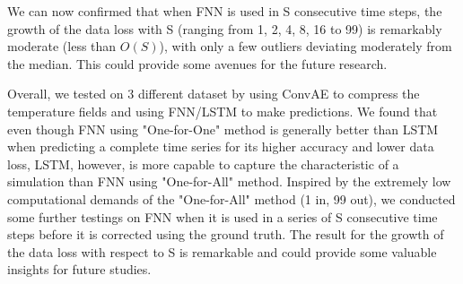 We can now confirmed that when FNN is used in S consecutive time steps, the growth of the data loss with S (ranging from 1, 2, 4, 8, 16 to 99) is remarkably moderate (less than $O(S)$), with only a few outliers deviating moderately from the median. This could provide some avenues for the future research.

Overall, we tested on 3 different dataset by using ConvAE to compress the temperature fields and using FNN/LSTM to make predictions. We found that even though FNN using "One-for-One" method is generally better than LSTM when predicting a complete time series for its higher accuracy and lower data loss, LSTM, however, is more capable to capture the characteristic of a simulation than FNN using "One-for-All" method. Inspired by the extremely low computational demands of the "One-for-All" method (1 in, 99 out), we conducted some further testings on FNN when it is used in a series of S consecutive time steps before it is corrected using the ground truth. The result for the growth of the data loss with respect to S is remarkable and could provide some valuable insights for future studies.




